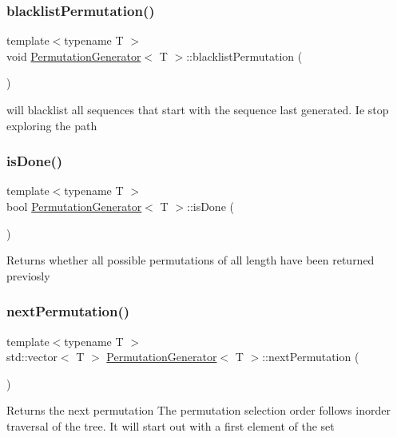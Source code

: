 \subsubsection{\texorpdfstring{blacklist\+Permutation()}{blacklistPermutation()}}
{\footnotesize\ttfamily template$<$typename T $>$ \\
void \hyperlink{classPermutationGenerator}{Permutation\+Generator}$<$ T $>$\+::blacklist\+Permutation (\begin{DoxyParamCaption}{ }\end{DoxyParamCaption})}

will blacklist all sequences that start with the sequence last generated. Ie stop exploring the path \mbox{\label{classPermutationGenerator_a4bee28112c8dece4337c9d65949216c6}} 
\subsubsection{\texorpdfstring{is\+Done()}{isDone()}}
{\footnotesize\ttfamily template$<$typename T $>$ \\
bool \hyperlink{classPermutationGenerator}{Permutation\+Generator}$<$ T $>$\+::is\+Done (\begin{DoxyParamCaption}{ }\end{DoxyParamCaption})}

\begin{DoxyReturn}{Returns}
whether all possible permutations of all length have been returned previosly 
\end{DoxyReturn}
\mbox{\label{classPermutationGenerator_a504d17b77c3289e19e95f2b60e8db24d}} 
\subsubsection{\texorpdfstring{next\+Permutation()}{nextPermutation()}}
{\footnotesize\ttfamily template$<$typename T $>$ \\
std\+::vector$<$ T $>$ \hyperlink{classPermutationGenerator}{Permutation\+Generator}$<$ T $>$\+::next\+Permutation (\begin{DoxyParamCaption}{ }\end{DoxyParamCaption})}

\begin{DoxyReturn}{Returns}
the next permutation The permutation selection order follows inorder traversal of the tree. It will start out with a first element of the set 
\end{DoxyReturn}
